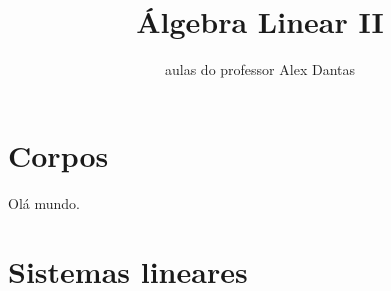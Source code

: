 \documentclass{scrreprt}
\title{Álgebra Linear II}
\author{aulas do professor Alex Dantas}
\begin{document}
\maketitle

\chapter{Corpos}


Olá mundo.

\chapter{Sistemas lineares}
\end{document}
